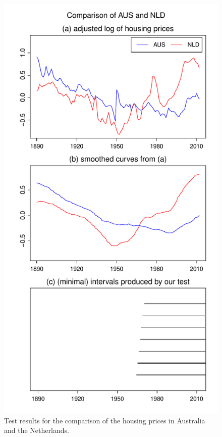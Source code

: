 \documentclass[a4paper,12pt]{article}
\begin{document}
\begin{figure}[b!]
\begin{minipage}[t]{0.49\textwidth}
\includegraphics[width=\textwidth]{Plots/hp_AUS_vs_NLD}
\caption{Test results for the comparison of the housing prices in Australia and the Netherlands.}\label{fig:hp:Australia:Netherlands}
\end{minipage}

\end{figure}
\end{document}
